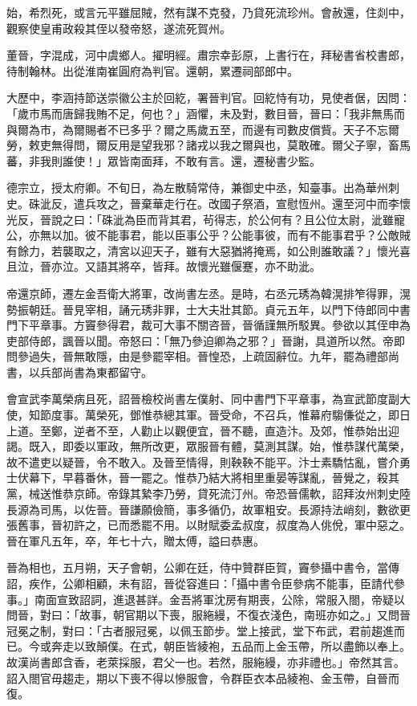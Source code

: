\begin{pinyinscope}
 始，希烈死，或言元平雖屈賊，然有謀不克發，乃貸死流珍州。會赦還，住剡中，觀察使皇甫政殺其侄以發帝怒，遂流死賀州。



 董晉，字混成，河中虞鄉人。擢明經。肅宗幸彭原，上書行在，拜秘書省校書郎，待制翰林。出從淮南崔圓府為判官。還朝，累遷祠部郎中。



 大歷中，李涵持節送崇徽公主於回紇，署晉判官。回紇恃有功，見使者倨，因問：「歲市馬而唐歸我賄不足，何也？」涵懼，未及對，數目晉，晉曰：「我非無馬而與爾為市，為爾賜者不已多乎？爾之馬歲五至，而邊有司數皮償貲。天子不忘爾勞，敕吏無得問，爾反用是望我邪？諸戎以我之爾與也，莫敢確。爾父子寧，畜馬蕃，非我則誰使！」眾皆南面拜，不敢有言。還，遷秘書少監。



 德宗立，授太府卿。不旬日，為左散騎常侍，兼御史中丞，知臺事。出為華州刺史。硃泚反，遣兵攻之，晉棄華走行在。改國子祭酒，宣慰恆州。還至河中而李懷光反，晉說之曰：「硃泚為臣而背其君，茍得志，於公何有？且公位太尉，泚雖寵公，亦無以加。彼不能事君，能以臣事公乎？公能事彼，而有不能事君乎？公敵賊有餘力，若襲取之，清宮以迎天子，雖有大惡猶將掩焉，如公則誰敢議？」懷光喜且泣，晉亦泣。又語其將卒，皆拜。故懷光雖偃蹇，亦不助泚。



 帝還京師，遷左金吾衛大將軍，改尚書左丞。是時，右丞元琇為韓滉排笮得罪，滉勢振朝廷。晉見宰相，誦元琇非罪，士大夫壯其節。貞元五年，以門下侍郎同中書門下平章事。方竇參得君，裁可大事不關咨晉，晉循謹無所駁異。參欲以其侄申為吏部侍郎，諷晉以聞。帝怒曰：「無乃參迫卿為之邪？」晉謝，具道所以然。帝即問參過失，晉無敢隱，由是參罷宰相。晉惶恐，上疏固辭位。九年，罷為禮部尚書，以兵部尚書為東都留守。



 會宣武李萬榮病且死，詔晉檢校尚書左僕射、同中書門下平章事，為宣武節度副大使，知節度事。萬榮死，鄧惟恭總其軍。晉受命，不召兵，惟幕府騶傔從之，即日上道。至鄭，逆者不至，人勸止以觀便宜，晉不聽，直造汴。及郊，惟恭始出迎謁。既入，即委以軍政，無所改更，眾服晉有體，莫測其謀。始，惟恭謀代萬榮，故不遣吏以疑晉，令不敢入。及晉至情得，則鞅鞅不能平。汴士素驕怙亂，嘗介勇士伏幕下，早暮番休，晉一罷之。惟恭乃結大將相里重晏等謀亂，晉覺之，殺其黨，械送惟恭京師。帝錄其縶李乃勞，貸死流汀州。帝恐晉儒軟，詔拜汝州刺史陸長源為司馬，以佐晉。晉謙願儉簡，事多循仍，故軍粗安。長源持法峭刻，數欲更張舊事，晉初許之，已而悉罷不用。以財賦委孟叔度，叔度為人佻侻，軍中惡之。晉在軍凡五年，卒，年七十六，贈太傅，謚曰恭惠。



 晉為相也，五月朔，天子會朝，公卿在廷，侍中贊群臣賀，竇參攝中書令，當傳詔，疾作，公卿相顧，未有詔，晉從容進曰：「攝中書令臣參病不能事，臣請代參事。」南面宣致詔詞，進退甚詳。金吾將軍沈房有期喪，公除，常服入閤，帝疑以問晉，對曰：「故事，朝官期以下喪，服絁縵，不復衣淺色，南班亦如之。」又問晉冠冕之制，對曰：「古者服冠冕，以佩玉節步。堂上接武，堂下布武，君前趨進而已。今或奔走以致顛僕。在式，朝臣皆綾袍，五品而上金玉帶，所以盡飾以奉上。故漢尚書郎含香，老萊採服，君父一也。若然，服絁縵，亦非禮也。」帝然其言。詔入閤官毋趨走，期以下喪不得以慘服會，令群臣衣本品綾袍、金玉帶，自晉而復。




\end{pinyinscope}
